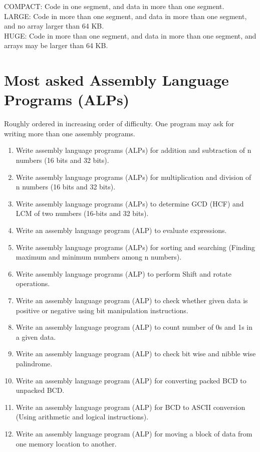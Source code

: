 \documentclass[12pt, a4paper]{scrartcl}
\begin{document}
	COMPACT: Code in one segment, and data in more than one segment.\\

	LARGE: Code in more than one segment, and data in more than one segment, and no array
	larger than 64 KB.\\

	HUGE: Code in more than one segment, and data in more than one segment, and arrays may be larger than 64 KB.

\section{Most asked Assembly Language Programs (ALPs)} Roughly ordered in increasing order of difficulty. One program may ask for writing more than one assembly programs.
	\begin{enumerate}
		\item Write assembly language programs (ALPs) for addition and subtraction of n numbers (16 bits and 32 bits).
		\item Write assembly language programs (ALPs) for multiplication and division of n numbers (16 bits and 32 bits).
		\item Write assembly language programs (ALPs) to determine GCD (HCF) and LCM of two numbers (16-bits and 32 bits).
		\item Write an assembly language program (ALP) to evaluate expressions.
		\item Write assembly language programs (ALPs) for sorting and searching (Finding maximum and minimum numbers among n numbers).
		\item Write assembly language programs (ALP) to perform Shift and rotate operations.
		\item Write an assembly language program (ALP) to check whether given data is positive or negative using bit manipulation instructions.
		\item Write an assembly language program (ALP) to count number of 0s and 1s in a given data.
		\item Write an assembly language program (ALP) to check bit wise and nibble wise palindrome.
		\item Write an assembly language program (ALP) for converting packed BCD to unpacked BCD.
		\item Write an assembly language program (ALP) for BCD to ASCII conversion (Using arithmetic and logical instructions).
		\item Write an assembly language program (ALP) for moving a block of data from one memory location to another.

\end{enumerate}
\end{document}
